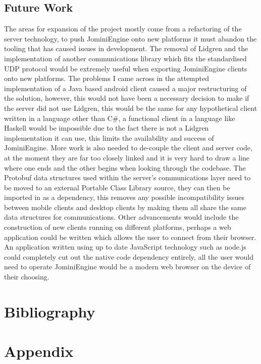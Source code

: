 \documentclass{article}
\begin{document}
\subsection{Future Work}

The areas for expansion of the project mostly come from a refactoring of the server technology, to push JominiEngine onto new platforms it must abandon the tooling that has caused issues in development. The removal of Lidgren and the implementation of another communications library which fits the standardised UDP protocol would be extremely useful when exporting JominiEngine clients onto new platforms. The problems I came across in the attempted implementation of a Java based android client caused a major restructuring of the solution, however, this would not have been a necessary decision to make if the server did not use Lidgren, this would be the same for any hypothetical client written in a language other than C\#, a functional client in a language like Haskell would be impossible due to the fact there is not a Lidgren implementation it can use, this limits the availability and success of JominiEngine. 
More work is also needed to de-couple the client and server code, at the moment they are far too closely linked and it is very hard to draw a line where one ends and the other begins when looking through the codebase. The Protobuf data structures used within the server’s communications layer need to be moved to an external Portable Class Library source, they can then be imported in as a dependency, this removes any possible incompatibility issues between mobile clients and desktop clients by making them all share the same data structures for communications.
Other advancements would include the construction of new clients running on different platforms, perhaps a web application could be written which allows the user to connect from their browser. An application written using up to date JavaScript technology such as node.js could completely cut out the native code dependency entirely, all the user would need to operate JominiEngine would be a modern web browser on the device of their choosing.
	\newpage
	\section{Bibliography}
	\printbibliography
	\newpage
	\section{Appendix}
\end{document}
